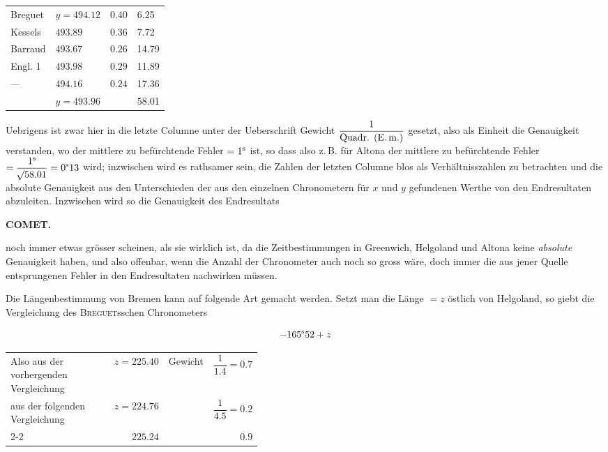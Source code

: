 \begin{center}
\begin{tabular}{ll|l|l}
Breguet & $y=494.12$ & $0.40$ & 6.25 \\
Kessels & $493.89$ & $0.36$ & 7.72 \\
Barraud & $493.67$ & $0.26$ & 14.79 \\
Engl. 1 & $493.98$ & $0.29$ & 11.89 \\
---\quad 4 & $494.16$ & $0.24$ & 17.36 \\
\hline
 & $y=493.96$ & & 58.01 \\
\end{tabular}
\end{center}

Uebrigens ist zwar hier in die letzte Columne unter der Ueberschrift Gewicht $\dfrac{1}{\text{Quadr. (E.\,m.)}}$
gesetzt, also als Einheit die Genauigkeit verstanden, wo der mittlere zu befürchtende Fehler $=1^{\rm s}$
ist, so dass also z.\,B. für Altona der mittlere zu befürchtende Fehler $=\dfrac{1^{\rm s}}{\mathord{{}^{}\!\surd}58.01}=0^{\rm s}13$
wird; inzwischen wird es rathsamer sein, die Zahlen der letzten Columne blos als Verhältnisszahlen
zu betrachten und die absolute Genauigkeit aus den Unterschieden der aus den einzelnen Chronometern
für $x$ und $y$ gefundenen Werthe von den Endresultaten abzuleiten. Inzwischen wird so die
Genauigkeit des Endresultats\par
\clearpage
\thispagestyle{empty}
\noindent{}%
\makebox[12mm][l]{}%
\parbox[t]{\dimexpr\linewidth-24mm\relax}{\centering\footnotesize\bfseries COMET.\par}%
\par\nobreak\medskip
\noindent noch immer etwas grösser scheinen, als sie wirklich ist, da die Zeitbestimmungen in Greenwich, Helgoland und Altona keine \emph{absolute} Genauigkeit haben, und also offenbar, wenn die Anzahl der Chronometer
auch noch so gross wäre, doch immer die aus jener Quelle entsprungenen Fehler in den Endresultaten nachwirken müssen.

Die Längenbestimmung von Bremen kann auf folgende Art gemacht werden. Setzt man die
Länge $=z$ östlich von Helgoland, so giebt die Vergleichung des \textsc{Breguet}sschen Chronometers

\[
-165^{\rm s}52+z
\]


\begin{center}\small
\begin{tabular}{p{0.42\linewidth} r l r}
Also aus der vorhergenden Vergleichung & $z=225.40$ & Gewicht & $\dfrac{1}{1.4}=0.7$ \\[5pt]
aus der folgenden Vergleichung & $z=224.76$ & & $\dfrac{1}{4.5}=0.2$ \\[8pt]
\cline{2-2}\cline{4-4}
 & $225.24$ & & $0.9$ \\
\end{tabular}
\end{center}

